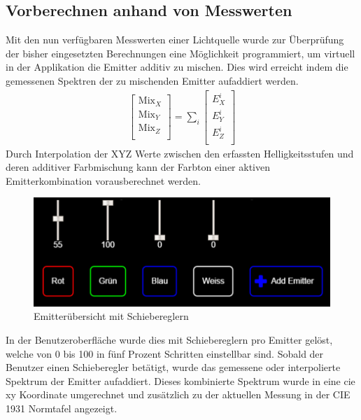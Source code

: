 \documentclass[11pt]{scrartcl}
\begin{document}
\subsection{Vorberechnen anhand von Messwerten}\label{calcColor}
Mit den nun verfügbaren Messwerten einer Lichtquelle wurde zur Überprüfung der bisher eingesetzten Berechnungen eine Möglichkeit programmiert,
um virtuell in der Applikation die Emitter additiv zu mischen. Dies wird erreicht indem die gemessenen Spektren der zu mischenden Emitter aufaddiert werden.
\begin{align}\label{Equ:22}
    \left[ \begin{array}{r}
        \text{Mix}_X \\
        \text{Mix}_Y \\
        \text{Mix}_Z \\
    \end{array}\right]
    = \sum_{i} \left[ \begin{array}{r}
        E^i_X \\
        E^i_Y \\
        E^i_Z \\
    \end{array}\right]
\end{align}
Durch Interpolation der XYZ Werte zwischen den erfassten Helligkeitsstufen und deren additiver Farbmischung kann der Farbton einer aktiven Emitterkombination
vorausberechnet werden.
\begin{figure}[H]
    \begin{center}
        \includegraphics[width=.9\textwidth]{images/app_emitters_with_sliders_v1.png}
    \end{center}
    \caption{Emitterübersicht mit Schiebereglern}\label{fig:emitterFaders}
\end{figure}
\noindent
In der Benutzeroberfläche wurde dies mit Schiebereglern pro Emitter gelöst, welche von 0 bis 100 in fünf Prozent Schritten einstellbar sind.
Sobald der Benutzer einen Schieberegler betätigt, wurde das gemessene oder interpolierte Spektrum der Emitter aufaddiert. Dieses kombinierte
Spektrum wurde in eine \ac{cie} xy Koordinate umgerechnet und zusätzlich zu der aktuellen Messung in der CIE 1931 Normtafel angezeigt.
\end{document}
